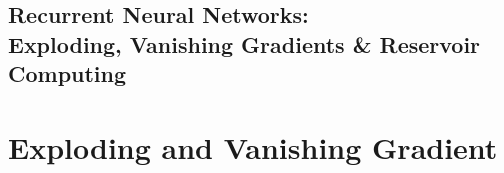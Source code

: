 \documentclass[12pt,letterpaper]{article}
\date{}
\begin{document}


\begin{center}
\section*{Recurrent Neural Networks:\\Exploding, Vanishing Gradients \& Reservoir Computing}
\end{center}




\section{Exploding and Vanishing Gradient}
\end{document}
